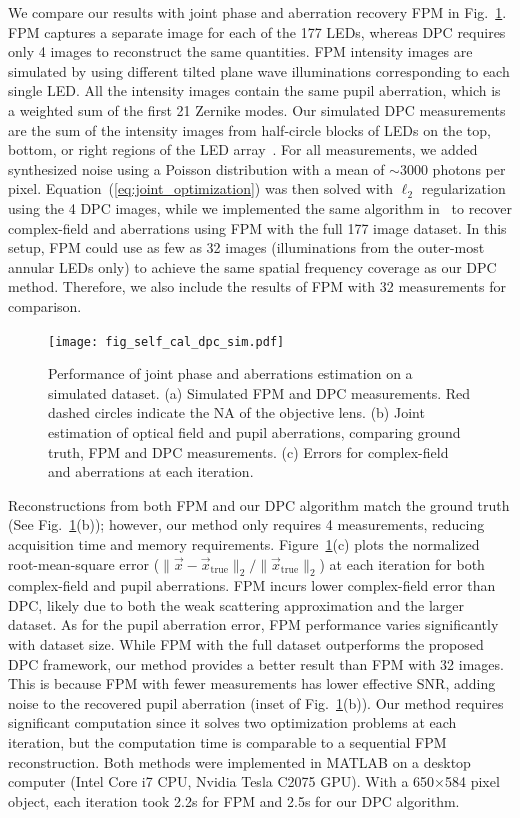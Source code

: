 We compare our results with joint phase and aberration recovery FPM in Fig.~\ref{fig:self_cal_simulation}. FPM captures a separate image for each of the 177 LEDs, whereas DPC requires only 4 images to reconstruct the same quantities. FPM intensity images are simulated by using different tilted plane wave illuminations corresponding to each single LED. All the intensity images contain the same pupil aberration, which is a weighted sum of the first 21 Zernike modes. Our simulated DPC measurements are the sum of the intensity images from half-circle blocks of LEDs on the top, bottom, or right regions of the LED array~\cite{tian2015quantitative}. For all measurements, we added synthesized noise using a Poisson distribution with a mean of $\sim$3000 photons per pixel. Equation~(\ref{eq:joint_optimization}) was then solved with $\ell_{2}$ regularization using the 4 DPC images, while we implemented the same algorithm in~\cite{Tian2014} to recover complex-field and aberrations using FPM with the full 177 image dataset. In this setup, FPM could use as few as 32 images (illuminations from the outer-most annular LEDs only) to achieve the same spatial frequency coverage as our DPC method. Therefore, we also include the results of FPM with 32 measurements for comparison.

\begin{figure}[ht!]
\centering\texttt{[image: fig\_self\_cal\_dpc\_sim.pdf]}
\caption{\label{fig:self_cal_simulation} Performance of joint phase and aberrations estimation on a simulated dataset. (a) Simulated FPM and DPC measurements. Red dashed circles indicate the $\mathrm{NA}$ of the objective lens. (b) Joint estimation of optical field and pupil aberrations, comparing ground truth, FPM and DPC measurements. (c) Errors for complex-field and aberrations at each iteration.}
\end{figure}

Reconstructions from both FPM and our DPC algorithm match the ground truth (See Fig.~\ref{fig:self_cal_simulation}(b)); however, our method only requires 4 measurements, reducing acquisition time and memory requirements. Figure~\ref{fig:self_cal_simulation}(c) plots the normalized root-mean-square error ($\|\vec{x}-\vec{x}_{\mathrm{true}}\|_{2}/\|\vec{x}_{\mathrm{true}}\|_{2}$) at each iteration for both complex-field and pupil aberrations. FPM incurs lower complex-field error than DPC, likely due to both the weak scattering approximation and the larger dataset. As for the pupil aberration error, FPM performance varies significantly with dataset size. While FPM with the full dataset outperforms the proposed DPC framework, our method provides a better result than FPM with 32 images. This is because FPM with fewer measurements has lower effective SNR, adding noise to the recovered pupil aberration (inset of Fig.~\ref{fig:self_cal_simulation}(b)). Our method requires significant computation since it solves two optimization problems at each iteration, but the computation time is comparable to a sequential FPM reconstruction. Both methods were implemented in MATLAB on a desktop computer (Intel Core i7 CPU, Nvidia Tesla C2075 GPU). With a 650$\times$584 pixel object, each iteration took 2.2s for FPM and 2.5s for our DPC algorithm.

